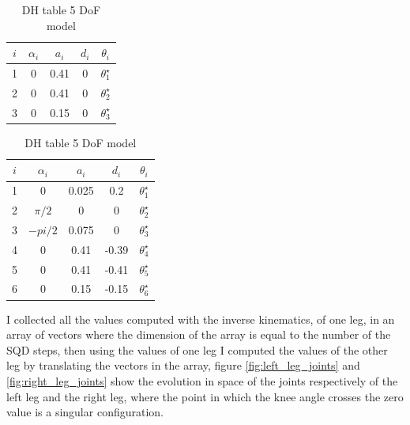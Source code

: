 \documentclass[a4paper]{article}
\begin{document}
\begin{table}
\begin{minipage}[b]{0.48\textwidth}
\centering
\begin{tabular}{|c|c|c|c|c|}
\hline
$i$          & $\alpha_i$        &  $a_i$ & $d_i$ & $\theta_i$    \\
\hline
1      & 0     & 0.41   &   0 &   $\theta_1^{\star}$ \\
\hline
2        & 0     & 0.41   &   0   & $\theta_2^{\star}$ \\
\hline
3          & 0   & 0.15    & 0      & $\theta_3^{\star}$\\
\hline
\end{tabular}
\caption{DH table 3 DoF model}
\label{tab:DH_3dof}
\end{minipage}
\begin{minipage}[b]{0.48\textwidth}
\centering
\begin{tabular}{|c|c|c|c|c|}
\hline
$i$          & $\alpha_i$        &  $a_i$ & $d_i$ & $\theta_i$    \\
\hline
1      & 0     & 0.025   &   0.2 &   $\theta_1^{\star}$ \\
\hline
2        & $\pi/2$     & 0   &   0   & $\theta_2^{\star}$ \\
\hline
3          & $-pi/2$   & 0.075    & 0      & $\theta_3^{\star}$\\
\hline
4      & 0     & 0.41   &   -0.39 &   $\theta_4^{\star}$ \\
\hline
5        & 0     & 0.41   &   -0.41   & $\theta_5^{\star}$ \\
\hline
6          & 0   & 0.15    & -0.15      & $\theta_6^{\star}$\\
\hline
\end{tabular}
\caption{DH table 5 DoF model}
\label{tab:DH_5dof}
\end{minipage}
\end{table}

I collected all the values computed with the inverse kinematics, of one leg, in an array of vectors  where the dimension of the array is equal to the number of the SQD steps, then using  the values of one leg I computed the values of the other leg by translating the vectors in the array, figure \ref{fig:left_leg_joints} and \ref{fig:right_leg_joints} show the evolution in space of the joints respectively of the left leg and the right leg, where the point in which the knee angle crosses the zero value is a singular configuration. 
\end{document}
